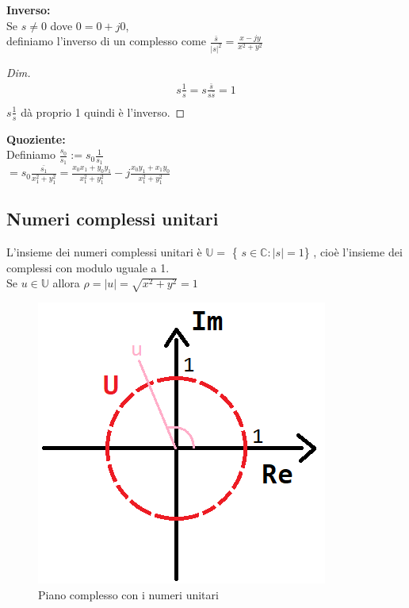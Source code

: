 \textbf{Inverso:} \\
Se $ s \neq 0 $ dove $ 0 = 0 + j0 $,\\
definiamo l'inverso di un complesso come $ \frac{ \bar{s} }{ |s|^{2}} = \frac{x-jy}{x^{2} + y^{2}} $ \\
\begin{proof}[Dim]
	\begin{equation*}
	\begin{split}
	s \frac{1}{s} = s \frac{ \bar{s} }{s \bar{s}} = 1 \\
	\end{split}
	\end{equation*}
	$s \frac{1}{s}$ dà proprio 1 quindi è l'inverso.
\end{proof}

\textbf{Quoziente:} \\
Definiamo $\frac{s_{0}}{s_{1}} := s_{0} \frac{ 1 }{ s_{1}} $ \\
$= s_{0} \frac{ \bar{s_{1} }}{x_{1}^{2} + y_{1}^{2}} = \frac{ x_{0} x_{1} + y_{0} y_{1} }{ x_{1}^{2} + y_{1}^{2} } - j \frac{ x_{0} y_{1} + x_{1} y_{0} }{ x_{1}^{2} + y_{1}^{2} } $\\

\subsection*{Numeri complessi unitari}
L'insieme dei numeri complessi unitari è $\mathbb{U} =$ \{ $s \in \mathbb{C} : |s|=1 $\} , cioè l'insieme dei complessi con modulo uguale a 1.\\
Se $ u \in \mathbb{U} $
allora $ \rho = |u| = \sqrt{ x^{2} + y^{2}} = 1 $

\begin{figure}[h]
	\centering
	\includegraphics[scale=0.5]{immagini/pianoComplessoUnitari}
	\caption{ Piano complesso con i numeri unitari }
	\label{fig: piano complesso unitari}
\end{figure}

